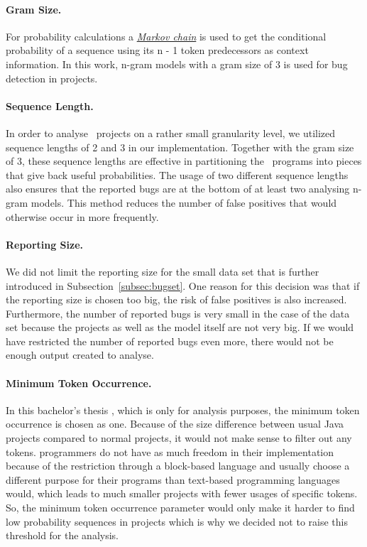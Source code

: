 \paragraph{Gram Size.}
For probability calculations a \hyperref[def:markov_chain]{\textit{Markov chain}} is used to get the conditional probability of a sequence using its n - 1 token predecessors as context information. In this work, n-gram models with a gram size of 3 is used for bug detection in \scratch{} projects. 
\paragraph{Sequence Length.}
In order to analyse \scratch\ projects on a rather small granularity level, we utilized sequence lengths of 2 and 3 in our implementation. Together with the gram size of 3, these sequence lengths are effective in partitioning the \scratch\ programs into pieces that give back useful probabilities. The usage of two different sequence lengths also ensures that the reported bugs are at the bottom of at least two analysing n-gram models. This method reduces the number of false positives that would otherwise occur in more frequently.
\paragraph{Reporting Size.}
We did not limit the reporting size for the small data set that is further introduced in Subsection~\ref{subsec:bugset}. One reason for this decision was that if the reporting size is chosen too big, the risk of false positives is also increased. Furthermore, the number of reported bugs is very small in the case of the data set because the projects as well as the model itself are not very big. If we would have restricted the number of reported bugs even more, there would not be enough output created to analyse.  
\paragraph{Minimum Token Occurrence.}
In this bachelor's thesis \ngram{}, which is only for \scratch{} analysis purposes, the minimum token occurrence is chosen as one. Because of the size difference between usual Java projects compared to normal \scratch{} projects, it would not make sense to filter out any tokens. \scratch{} programmers do not have as much freedom in their implementation because of the restriction through a block-based language and usually choose a different purpose for their programs than text-based programming languages would, which leads to much smaller projects with fewer usages of specific tokens. So, the minimum token occurrence parameter would only make it harder to find low probability sequences in projects which is why we decided not to raise this threshold for the analysis.
